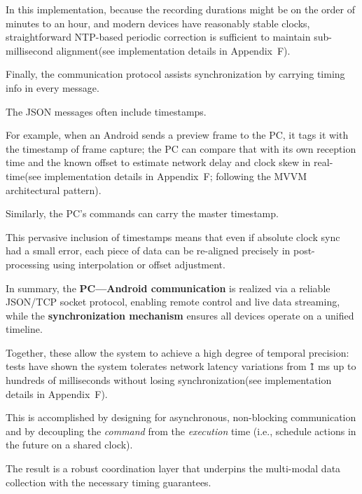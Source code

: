 In this implementation, because the recording durations might be on the order of
minutes to an hour, and modern devices have reasonably stable clocks, straightforward
NTP-based periodic correction is sufficient to maintain sub-millisecond alignment(see
implementation details in Appendix~F).

Finally, the communication protocol assists synchronization by carrying timing info
in every message.

The JSON messages often include timestamps.

For example, when an Android sends a preview frame to the PC, it tags it with the
timestamp of frame capture; the PC can compare that with its own reception time and
the known offset to estimate network delay and clock skew in real-time(see
implementation details in Appendix~F; following the MVVM architectural pattern).

Similarly, the PC's commands can carry the master timestamp.

This pervasive inclusion of timestamps means that even if absolute clock sync had a
small error, each piece of data can be re-aligned precisely in post-processing using
interpolation or offset adjustment.

In summary, the \textbf{PC---Android communication}
 is realized via a reliable JSON/TCP socket protocol, enabling remote
 control and live data streaming, while the \textbf{synchronization mechanism}
 ensures all devices operate on a unified timeline.

Together, these allow the system to achieve a high degree of temporal precision:
tests have shown the system tolerates network latency variations from \~1 ms up to
hundreds of milliseconds without losing synchronization(see implementation details in
Appendix~F).

This is accomplished by designing for asynchronous, non-blocking communication and by
decoupling the \textit{command} from the \textit{execution} time (i.e., schedule
actions in the future on a shared clock).

The result is a robust coordination layer that underpins the multi-modal data
collection with the necessary timing guarantees.

